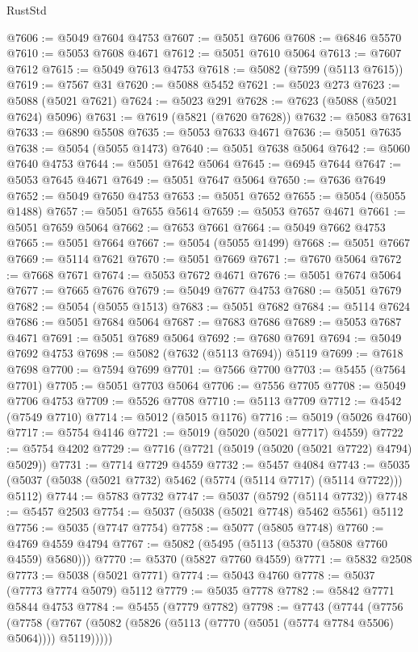 \begin{lexlean}{RustStd}
\begin{coremodule}
@7606 := @5049 @7604 @4753
@7607 := @5051 @7606
@7608 := @6846 @5570
@7610 := @5053 @7608 @4671
@7612 := @5051 @7610 @5064
@7613 := @7607 @7612
@7615 := @5049 @7613 @4753
@7618 := @5082 (@7599 (@5113 @7615))
@7619 := @7567 @31
@7620 := @5088 @5452
@7621 := @5023 @273
@7623 := @5088 (@5021 @7621)
@7624 := @5023 @291
@7628 := @7623 (@5088 (@5021 @7624) @5096)
@7631 := @7619 (@5821 (@7620 @7628))
@7632 := @5083 @7631
@7633 := @6890 @5508
@7635 := @5053 @7633 @4671
@7636 := @5051 @7635
@7638 := @5054 (@5055 @1473)
@7640 := @5051 @7638 @5064
@7642 := @5060 @7640 @4753
@7644 := @5051 @7642 @5064
@7645 := @6945 @7644
@7647 := @5053 @7645 @4671
@7649 := @5051 @7647 @5064
@7650 := @7636 @7649
@7652 := @5049 @7650 @4753
@7653 := @5051 @7652
@7655 := @5054 (@5055 @1488)
@7657 := @5051 @7655 @5614
@7659 := @5053 @7657 @4671
@7661 := @5051 @7659 @5064
@7662 := @7653 @7661
@7664 := @5049 @7662 @4753
@7665 := @5051 @7664
@7667 := @5054 (@5055 @1499)
@7668 := @5051 @7667
@7669 := @5114 @7621
@7670 := @5051 @7669
@7671 := @7670 @5064
@7672 := @7668 @7671
@7674 := @5053 @7672 @4671
@7676 := @5051 @7674 @5064
@7677 := @7665 @7676
@7679 := @5049 @7677 @4753
@7680 := @5051 @7679
@7682 := @5054 (@5055 @1513)
@7683 := @5051 @7682
@7684 := @5114 @7624
@7686 := @5051 @7684 @5064
@7687 := @7683 @7686
@7689 := @5053 @7687 @4671
@7691 := @5051 @7689 @5064
@7692 := @7680 @7691
@7694 := @5049 @7692 @4753
@7698 := @5082 (@7632 (@5113 @7694)) @5119
@7699 := @7618 @7698
@7700 := @7594 @7699
@7701 := @7566 @7700
@7703 := @5455 (@7564 @7701)
@7705 := @5051 @7703 @5064
@7706 := @7556 @7705
@7708 := @5049 @7706 @4753
@7709 := @5526 @7708
@7710 := @5113 @7709
@7712 := @4542 (@7549 @7710)
@7714 := @5012 (@5015 @1176)
@7716 := @5019 (@5026 @4760)
@7717 := @5754 @4146
@7721 := @5019 (@5020 (@5021 @7717) @4559)
@7722 := @5754 @4202
@7729 := @7716 (@7721 (@5019 (@5020 (@5021 @7722) @4794) @5029))
@7731 := @7714 @7729 @4559
@7732 := @5457 @4084
@7743 := @5035 (@5037 (@5038 (@5021 @7732) @5462 (@5774 (@5114 @7717) (@5114 @7722))) @5112)
@7744 := @5783 @7732
@7747 := @5037 (@5792 (@5114 @7732))
@7748 := @5457 @2503
@7754 := @5037 (@5038 (@5021 @7748) @5462 @5561) @5112
@7756 := @5035 (@7747 @7754)
@7758 := @5077 (@5805 @7748)
@7760 := @4769 @4559 @4794
@7767 := @5082 (@5495 (@5113 (@5370 (@5808 @7760 @4559) @5680)))
@7770 := @5370 (@5827 @7760 @4559)
@7771 := @5832 @2508
@7773 := @5038 (@5021 @7771)
@7774 := @5043 @4760
@7778 := @5037 (@7773 @7774 @5079) @5112
@7779 := @5035 @7778
@7782 := @5842 @7771 @5844 @4753
@7784 := @5455 (@7779 @7782)
@7798 := @7743
    (@7744
      (@7756
        (@7758 (@7767 (@5082 (@5826 (@5113 (@7770 (@5051 (@5774 @7784 @5506) @5064)))) @5119)))))

\end{coremodule}
\end{lexlean}
